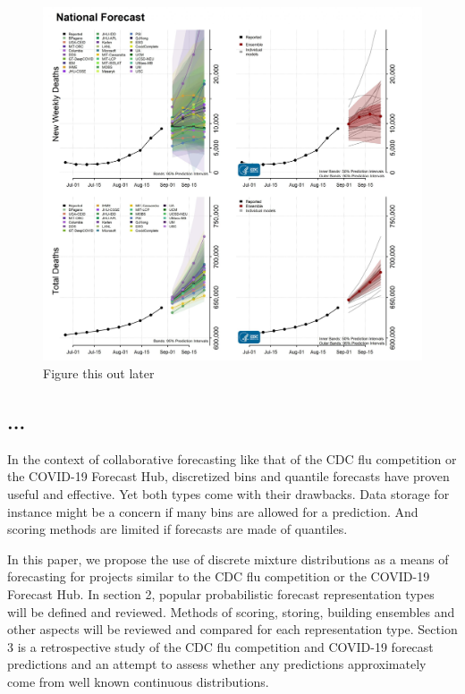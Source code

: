 \documentclass{article}\usepackage[]{graphicx}\usepackage[]{color}
\begin{document}
\begin{figure}[htbp]
\centerline{\includegraphics[scale=.12]{8_30_21_cvd_deaths.jpeg}}
\caption{Figure this out later}
\label{fig}
\end{figure}

\subsection{...}
In the context of collaborative forecasting like that of the CDC flu competition
or the COVID-19 Forecast Hub, discretized bins and quantile forecasts have 
proven useful and effective. Yet both types come with their drawbacks. Data 
storage for instance might be a concern if many bins are allowed for a 
prediction. And scoring methods are limited if forecasts are made of quantiles.

In this paper, we propose the use of discrete mixture distributions as a means 
of forecasting for projects similar to the CDC flu competition or the COVID-19
Forecast Hub. In section 2, popular probabilistic forecast representation 
types will be defined and reviewed. Methods of scoring, storing, building 
ensembles and other aspects will be reviewed and compared for each 
representation type.
Section 3 is a retrospective study of the CDC flu competition and COVID-19 
forecast predictions and an attempt to assess whether any predictions 
approximately come from well known continuous distributions.
\end{document}
